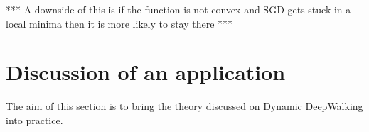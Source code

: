 \documentclass[a4paper]{article}
\begin{document}
*** A downside of this is if the function is not convex and SGD gets stuck in a
local minima then it is more likely to stay there ***

\section{Discussion of an application}

The aim of this section is to bring the theory discussed on Dynamic DeepWalking
into practice.






\printindex
\end{document}
